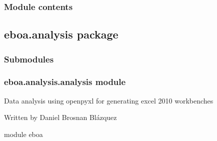 \subsubsection{Module contents}
\label{\detokenize{eboa.engine:module-eboa.engine}}\label{\detokenize{eboa.engine:module-contents}}

\subsection{eboa.analysis package}
\label{\detokenize{eboa.analysis:eboa-analysis-package}}\label{\detokenize{eboa.analysis::doc}}

\subsubsection{Submodules}
\label{\detokenize{eboa.analysis:submodules}}

\subsubsection{eboa.analysis.analysis module}
\label{\detokenize{eboa.analysis:module-eboa.analysis.analysis}}\label{\detokenize{eboa.analysis:eboa-analysis-analysis-module}}
Data analysis using openpyxl for generating excel 2010 workbenches

Written by Daniel Brosnan Blázquez

module eboa

